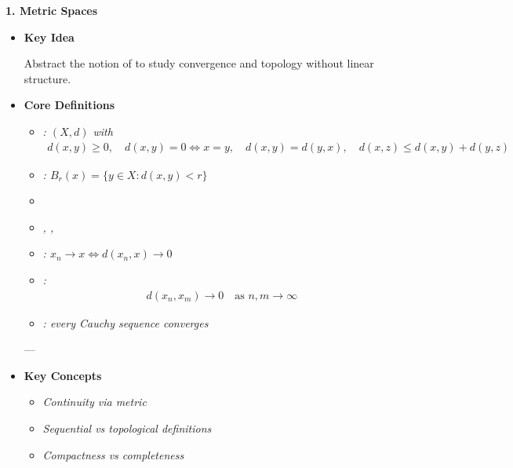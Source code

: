 \documentclass[12pt,a4paper]{report}
\begin{document}
\begin{description}
\item \textbf{1. Metric Spaces}

    \begin{itemize}
    \item \textbf{Key Idea}

Abstract the notion of  to study convergence and topology without linear structure.

    \item \textbf{Core Definitions}

            \begin{itemize}
            \item \textit{: $(X,d)$ with}
\begin{align*}
  d(x,y)\ge 0,\quad d(x,y)=0 \iff x=y,\quad d(x,y)=d(y,x),\quad d(x,z)\le d(x,y)+d(y,z)
\end{align*}

            \item \textit{: $B_r(x)=\{y\in X: d(x,y)<r\}$}

            \item \textit{}

            \item \textit{, , }

            \item \textit{: $x_n \to x \iff d(x_n,x)\to 0$}

            \item \textit{:}
\begin{align*}
  d(x_n,x_m)\to 0 \quad \text{as } n,m\to\infty
\end{align*}

            \item \textit{: every Cauchy sequence converges}
            \end{itemize}

---

    \item \textbf{Key Concepts}

            \begin{itemize}
            \item \textit{Continuity via metric}
            \item \textit{Sequential vs topological definitions}
            \item \textit{Compactness vs completeness}
            \end{itemize}


\end{itemize}
\end{description}
\end{document}
